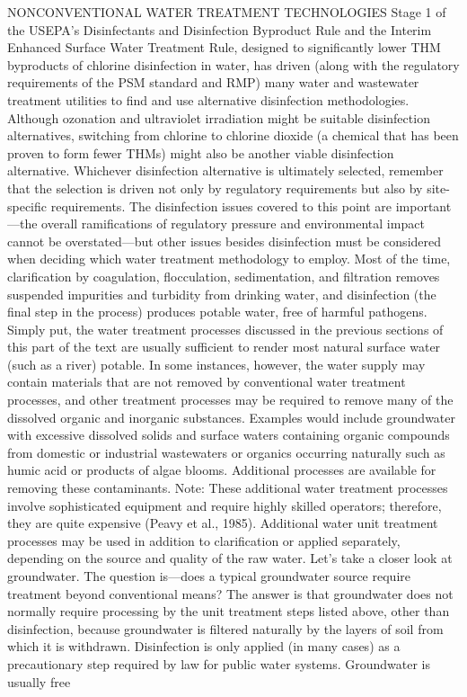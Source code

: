 \documentclass{article}
\begin{document}
NONCONVENTIONAL WATER TREATMENT TECHNOLOGIES Stage 1 of the USEPA's
Disinfectants and Disinfection Byproduct Rule and the Interim Enhanced
Surface Water Treatment Rule, designed to significantly lower THM
byproducts of chlorine disinfection in water, has driven (along with the
regulatory requirements of the PSM standard and RMP) many water and
wastewater treatment utilities to find and use alternative disinfection
methodologies. Although ozonation and ultraviolet irradiation might be
suitable disinfection alternatives, switching from chlorine to chlorine
dioxide (a chemical that has been proven to form fewer THMs) might also
be another viable disinfection alternative. Whichever disinfection
alternative is ultimately selected, remember that the selection is
driven not only by regulatory requirements but also by site-specific
requirements. The disinfection issues covered to this point are
important---the overall ramifications of regulatory pressure and
environmental impact cannot be overstated---but other issues besides
disinfection must be considered when deciding which water treatment
methodology to employ. Most of the time, clarification by coagulation,
flocculation, sedimentation, and filtration removes suspended impurities
and turbidity from drinking water, and disinfection (the final step in
the process) produces potable water, free of harmful pathogens. Simply
put, the water treatment processes discussed in the previous sections of
this part of the text are usually sufficient to render most natural
surface water (such as a river) potable. In some instances, however, the
water supply may contain materials that are not removed by conventional
water treatment processes, and other treatment processes may be required
to remove many of the dissolved organic and inorganic substances.
Examples would include groundwater with excessive dissolved solids and
surface waters containing organic compounds from domestic or industrial
wastewaters or organics occurring naturally such as humic acid or
products of algae blooms. Additional processes are available for
removing these contaminants. Note: These additional water treatment
processes involve sophisticated equipment and require highly skilled
operators; therefore, they are quite expensive (Peavy et al., 1985).
Additional water unit treatment processes may be used in addition to
clarification or applied separately, depending on the source and quality
of the raw water. Let's take a closer look at groundwater. The question
is---does a typical groundwater source require treatment beyond
conventional means? The answer is that groundwater does not normally
require processing by the unit treatment steps listed above, other than
disinfection, because groundwater is filtered naturally by the layers of
soil from which it is withdrawn. Disinfection is only applied (in many
cases) as a precautionary step required by law for public water systems.
Groundwater is usually free
\end{document}
